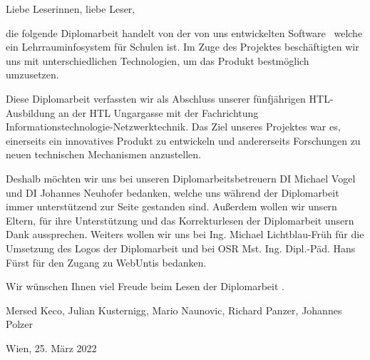
Liebe Leserinnen, liebe Leser,

die folgende Diplomarbeit handelt von der von uns entwickelten Software \ZELIA\, welche ein Lehrrauminfosystem für Schulen ist. Im Zuge des Projektes beschäftigten wir uns mit unterschiedlichen Technologien, um das Produkt bestmöglich umzusetzen.

Diese Diplomarbeit verfassten wir als Abschluss unserer fünfjährigen HTL-Ausbildung an der HTL Ungargasse mit der Fachrichtung Informations\-technologie-Netzwerk\-technik. Das Ziel unseres Projektes war es, einerseits ein innovatives Produkt zu entwickeln und andererseits Forschungen zu neuen technischen Mechanismen anzustellen.

Deshalb möchten wir uns bei unseren Diplomarbeitsbetreuern DI Michael Vogel und DI Johannes Neuhofer bedanken, welche uns während der Diplomarbeit immer unterstützend zur Seite gestanden sind. Außerdem wollen wir unsern Eltern, für ihre Unterstützung und das Korrekturlesen der Diplomarbeit unsern Dank aussprechen. Weiters wollen wir uns bei Ing. Michael Lichtblau-Früh für die Umsetzung des Logos der Diplomarbeit und bei OSR Mst. Ing. Dipl.-Päd. Hans Fürst für den Zugang zu WebUntis bedanken.

Wir wünschen Ihnen viel Freude beim Lesen der Diplomarbeit \ZELIA.

Mersed Keco, Julian Kusternigg, Mario Naunovic, Richard Panzer, Johannes Polzer

Wien, 25. März 2022
